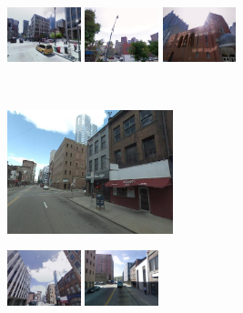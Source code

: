 \documentclass[table]{article} %
\begin{document}
\begin{figure}
\begin{minipage}{0.75\linewidth}
\begin{minipage}{\linewidth}
                \colorbox{myGreen}{\includegraphics[height=16mm]{imgs/ex3/FV2}}
                \colorbox{myRed}{\includegraphics[height=16mm]{imgs/ex3/FV3}}
                \colorbox{myRed}{\includegraphics[height=16mm]{imgs/ex3/FV4}}
            \end{minipage} 
        \end{minipage}
        \vspace{3mm}
        \\
        \begin{minipage}{0.34\linewidth}
            \centering
            \vspace{0mm}
            \includegraphics[height=36mm]{imgs/ex4/query}
        \end{minipage}
        \begin{minipage}{0.75\linewidth}
            \begin{minipage}{\linewidth} 
                \colorbox{myGreen}{\includegraphics[height=16mm]{imgs/ex4/FVsvm1}}
                \colorbox{myRed}{\includegraphics[height=16mm]{imgs/ex4/FVsvm2}}

\end{minipage}
\end{minipage}
\end{figure}
\end{document}
